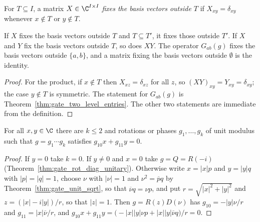 \begin{definition}
    \label{def:gate_fixes_outside}
    \leanok
    For $T\subseteq I$, a matrix $X\in\C^{I\times I}$ \emph{fixes the basis
    vectors outside $T$} if $X_{xy}=\delta_{xy}$ whenever $x\notin T$ or
    $y\notin T$.
\end{definition}

\begin{theorem}
    \label{thm:gate_fixes_outside}
    \leanok
    If $X$ fixes the basis vectors outside $T$ and $T\subseteq T'$, it fixes
    those outside $T'$. If $X$ and $Y$ fix the basis vectors outside $T$, so
    does $XY$. The operator $G_{ab}(g)$ fixes the basis vectors outside
    $\{a,b\}$, and a matrix fixing the basis vectors outside $\emptyset$ is
    the identity.
\end{theorem}
\begin{proof}\leanok
    For the product, if $x\notin T$ then $X_{xz}=\delta_{xz}$ for all $z$, so
    $(XY)_{xy}=Y_{xy}=\delta_{xy}$; the case $y\notin T$ is symmetric. The
    statement for $G_{ab}(g)$ is Theorem~\ref{thm:gate_two_level_entries}.
    The other two statements are immediate from the definition.
\end{proof}

\begin{theorem}
    \label{thm:gate_two_level_elim}
    \leanok
    For all $x,y\in\C$ there are $k\leq2$ and rotations or phases
    $g_1,\ldots,g_k$ of unit modulus such that $g=g_1\cdots g_k$ satisfies
    $g_{10}x+g_{11}y=0$.
\end{theorem}
\begin{proof}\leanok
    If $y=0$ take $k=0$. If $y\neq0$ and $x=0$ take $g=Q=R(-i)$
    (Theorem~\ref{thm:gate_rot_diag_unitary}). Otherwise write $x=|x|p$ and
    $y=|y|q$ with $|p|=|q|=1$, choose $\nu$ with $|\nu|=1$ and
    $\nu^2=\overline pq$ by Theorem~\ref{thm:gate_unit_sqrt}, so that
    $\overline\nu q=\nu p$, and put $r=\sqrt{|x|^2+|y|^2}$ and
    $z=(|x|-i|y|)/r$, so that $|z|=1$. Then $g=R(z)D(\nu)$ has
    $g_{10}=-|y|\nu/r$ and $g_{11}=|x|\overline\nu/r$, and
    $g_{10}x+g_{11}y=\bigl(-|x||y|\nu p+|x||y|\overline\nu q\bigr)/r=0$.
\end{proof}

